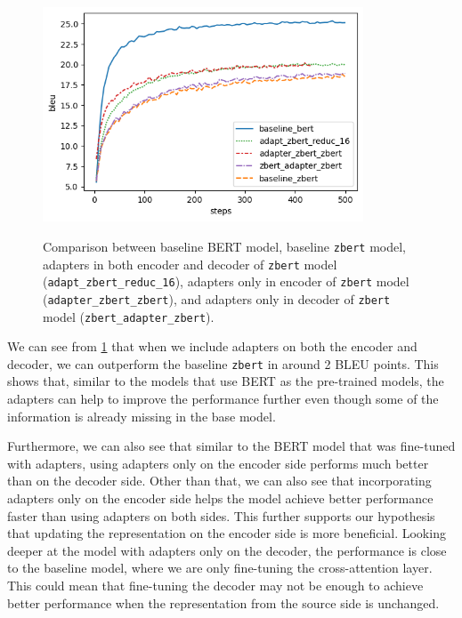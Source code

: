 \begin{figure}[h]
    {\includegraphics[width=0.85\textwidth]{img/zbert_pos.png}}
    \centering
    \caption[Comparison between baseline BERT and \texttt{zbert} models.]{Comparison between baseline BERT model, baseline \texttt{zbert} model, adapters in both encoder and decoder of \texttt{zbert} model (\texttt{adapt\_zbert\_reduc\_16}), adapters only in encoder of \texttt{zbert} model (\texttt{adapter\_zbert\_zbert}), and adapters only in decoder of \texttt{zbert} model (\texttt{zbert\_adapter\_zbert}).}
    \label{img:zbert_pos}
\end{figure}

We can see from \cref{img:zbert_pos} that when we include adapters on both the encoder and decoder, we can outperform the baseline \texttt{zbert} in around 2 BLEU points. This shows that, similar to the models that use BERT as the pre-trained models, the adapters can help to improve the performance further even though some of the information is already missing in the base model.

Furthermore, we can also see that similar to the BERT model that was fine-tuned with adapters, using adapters only on the encoder side performs much better than on the decoder side. Other than that, we can also see that incorporating adapters only on the encoder side helps the model achieve better performance faster than using adapters on both sides. This further supports our hypothesis that updating the representation on the encoder side is more beneficial. Looking deeper at the model with adapters only on the decoder, the performance is close to the baseline model, where we are only fine-tuning the cross-attention layer. This could mean that fine-tuning the decoder may not be enough to achieve better performance when the representation from the source side is unchanged.

